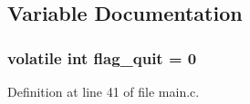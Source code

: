 \subsection{Variable Documentation}
\subsubsection[{flag\_\-quit}]{\setlength{\rightskip}{0pt plus 5cm}volatile int {\bf flag\_\-quit} = 0}\label{main_8c_aa93be71a208cd9a64285d2768b8ee7f8}


Definition at line 41 of file main.c.
